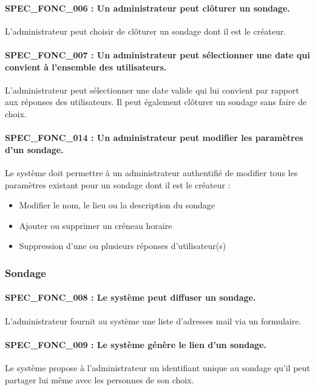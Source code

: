 \documentclass[]{report}
\begin{document}
\paragraph{SPEC\_FONC\_006 : Un administrateur peut clôturer un sondage. }
L’administrateur peut choisir de clôturer un sondage dont il est le créateur.

\paragraph{SPEC\_FONC\_007 : Un administrateur peut sélectionner une date qui convient à l’ensemble des utilisateurs.}
L’administrateur peut sélectionner une date valide qui lui convient par rapport aux réponses des utilisateurs. Il peut également clôturer un sondage sans faire de choix.

\paragraph{SPEC\_FONC\_014 : Un administrateur peut modifier les paramètres d’un sondage.}
Le système doit permettre à un administrateur authentifié de modifier tous les paramètres existant pour un sondage dont il est le créateur : \begin{itemize}
\item Modifier le nom, le lieu ou la description du sondage
\item Ajouter ou supprimer un créneau horaire
\item Suppression d’une ou plusieurs réponses d’utilisateur(s) \end{itemize}

\subsubsection{Sondage}

\paragraph{SPEC\_FONC\_008 : Le système peut diffuser un sondage.}
L’administrateur fournit au système une liste d’adresses mail via un formulaire. 

\paragraph{SPEC\_FONC\_009 : Le système génère le lien d’un sondage.}
Le système propose à l’administrateur un identifiant unique au sondage qu’il peut partager lui même avec les personnes de son choix.
\end{document}
